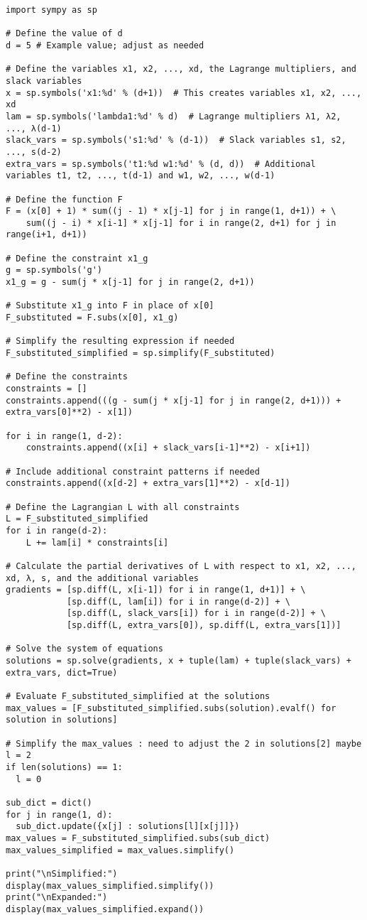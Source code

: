 \documentclass[11pt]{article}
\begin{document}
\newpage
\begin{lstlisting}[style= Sage]
import sympy as sp

# Define the value of d
d = 5 # Example value; adjust as needed

# Define the variables x1, x2, ..., xd, the Lagrange multipliers, and slack variables
x = sp.symbols('x1:%d' % (d+1))  # This creates variables x1, x2, ..., xd
lam = sp.symbols('lambda1:%d' % d)  # Lagrange multipliers λ1, λ2, ..., λ(d-1)
slack_vars = sp.symbols('s1:%d' % (d-1))  # Slack variables s1, s2, ..., s(d-2)
extra_vars = sp.symbols('t1:%d w1:%d' % (d, d))  # Additional variables t1, t2, ..., t(d-1) and w1, w2, ..., w(d-1)

# Define the function F
F = (x[0] + 1) * sum((j - 1) * x[j-1] for j in range(1, d+1)) + \
    sum((j - i) * x[i-1] * x[j-1] for i in range(2, d+1) for j in range(i+1, d+1))

# Define the constraint x1_g
g = sp.symbols('g')
x1_g = g - sum(j * x[j-1] for j in range(2, d+1))

# Substitute x1_g into F in place of x[0]
F_substituted = F.subs(x[0], x1_g)

# Simplify the resulting expression if needed
F_substituted_simplified = sp.simplify(F_substituted)

# Define the constraints
constraints = []
constraints.append(((g - sum(j * x[j-1] for j in range(2, d+1))) + extra_vars[0]**2) - x[1])

for i in range(1, d-2):
    constraints.append((x[i] + slack_vars[i-1]**2) - x[i+1])

# Include additional constraint patterns if needed
constraints.append((x[d-2] + extra_vars[1]**2) - x[d-1])

# Define the Lagrangian L with all constraints
L = F_substituted_simplified
for i in range(d-2):
    L += lam[i] * constraints[i]

# Calculate the partial derivatives of L with respect to x1, x2, ..., xd, λ, s, and the additional variables
gradients = [sp.diff(L, x[i-1]) for i in range(1, d+1)] + \
            [sp.diff(L, lam[i]) for i in range(d-2)] + \
            [sp.diff(L, slack_vars[i]) for i in range(d-2)] + \
            [sp.diff(L, extra_vars[0]), sp.diff(L, extra_vars[1])]

# Solve the system of equations
solutions = sp.solve(gradients, x + tuple(lam) + tuple(slack_vars) + extra_vars, dict=True)

# Evaluate F_substituted_simplified at the solutions
max_values = [F_substituted_simplified.subs(solution).evalf() for solution in solutions]

# Simplify the max_values : need to adjust the 2 in solutions[2] maybe 
l = 2
if len(solutions) == 1:
  l = 0

sub_dict = dict()
for j in range(1, d):
  sub_dict.update({x[j] : solutions[l][x[j]]})
max_values = F_substituted_simplified.subs(sub_dict)
max_values_simplified = max_values.simplify()

print("\nSimplified:")
display(max_values_simplified.simplify())
print("\nExpanded:")
display(max_values_simplified.expand())
\end{lstlisting}
\end{document}
